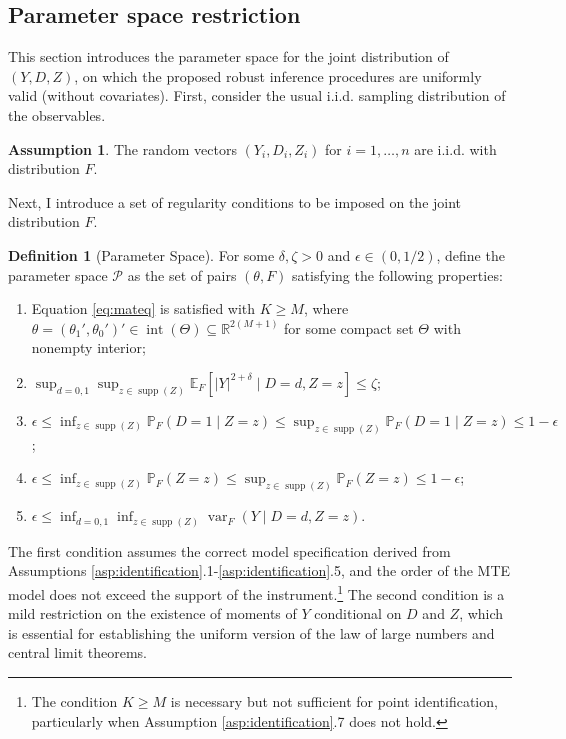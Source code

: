 \documentclass[11pt]{article}
\theoremstyle{definition}
\newtheorem{definition}{Definition}[section]
\newtheorem{assumption}{Assumption}
\DeclareMathOperator*{\supp}{supp}
\DeclareMathOperator{\var}{var}
\newcommand{\R}{\ensuremath{\mathbb{R}}}
\newcommand{\Exp}{\ensuremath{\mathbb{E}}} %
\newcommand{\Prob}{\ensuremath{\mathbb{P}}} %
\newcommand{\0}{\ensuremath{\mathbf{0}}}
\begin{document}
\begin{bibunit}
\subsection{Parameter space restriction}
\label{sec:parameter_space}

This section introduces the parameter space for the joint distribution of $(Y,D,Z)$, on which the proposed robust inference procedures are uniformly valid (without covariates). First, consider the usual i.i.d. sampling distribution of the observables.
\begin{assumption}
\label{asp:iid}
	The random vectors $(Y_i, D_i, Z_i)$ for $i = 1,\ldots,n$ are i.i.d. with distribution $F$.
\end{assumption}
Next, I introduce a set of regularity conditions to be imposed on the joint distribution $F$. 
\begin{definition}[Parameter Space]
\label{def:parameter_space}
    For some $\delta, \zeta > 0$ and $\epsilon \in (0,1/2)$, define the parameter space $\mathcal{P}$ as the set of pairs $(\theta,F)$ satisfying the following properties:
\begin{enumerate}
	\item Equation \eqref{eq:mateq} is satisfied with $K \geq M$, where $\theta = (\theta_1', \theta_0')' \in \operatorname{int}(\Theta) \subseteq \R^{2(M+1)}$ for some compact set $\Theta$ with nonempty interior;
	\item $\sup_{d=0,1}\sup_{z\in \supp(Z)}\Exp_F[|Y|^{2+\delta}\mid D=d, Z=z] \leq \zeta$;
	\item $\epsilon \leq \inf_{z \in \supp(Z)}\Prob_F(D=1\mid Z=z) \leq \sup_{z \in \supp(Z)}\Prob_F(D=1\mid Z=z) \leq 1-\epsilon$;
	\item $\epsilon \leq \inf_{z\in\supp(Z)}\Prob_F(Z=z) \leq \sup_{z\in\supp(Z)} \Prob_{F}(Z=z) \leq 1-\epsilon$;
	\item $\epsilon \leq \inf_{d=0,1}\inf_{z\in\supp(Z)}\var_F(Y\mid D=d, Z=z)$.
\end{enumerate}
\end{definition}
The first condition assumes the correct model specification derived from  Assumptions \ref{asp:identification}.1-\ref{asp:identification}.5, and the order of the MTE model does not exceed the support of the instrument.\footnote{The condition $K\geq M$ is necessary but not sufficient for point identification, particularly when Assumption \ref{asp:identification}.7 does not hold.} The second condition is a mild restriction on the existence of moments of $Y$ conditional on $D$ and $Z$, which is essential for establishing the uniform version of the law of large numbers and central limit theorems. 

\end{bibunit}
\end{document}
